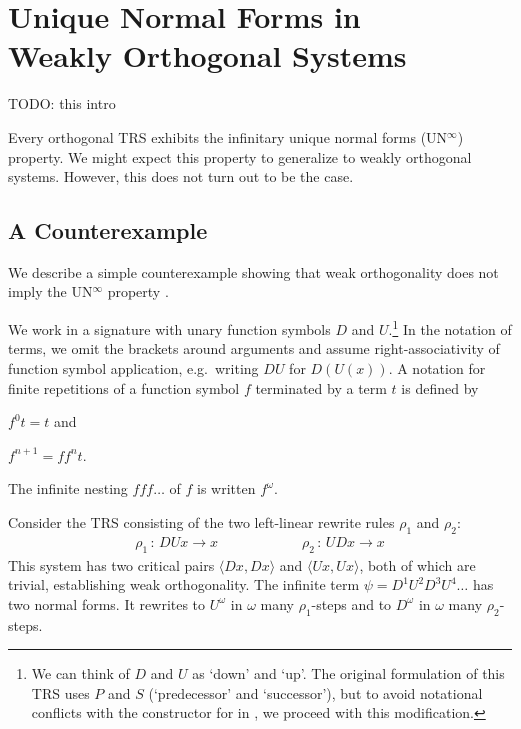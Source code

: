 \chapter[\texorpdfstring{UN$^\infty$ in Weakly Orthogonal Systems}{UN
  in Weakly Orthogonal Systems}]{\texorpdfstring{Unique Normal Forms
    in\\Weakly Orthogonal Systems}{Unique Normal Forms in Weakly
    Orthogonal Systems}}\label{chap:unwo}

TODO: this intro

Every orthogonal TRS exhibits the infinitary unique normal forms
(UN$^\infty$) property. We might expect this property to generalize to
weakly orthogonal systems. However, this does not turn out to be the
case.


\section{A Counterexample}\label{sec:counterexample}


We describe a simple counterexample showing that weak orthogonality
does not imply the UN$^\infty$ property \citep{endrullis-10}.

We work in a signature with unary function symbols $D$ and
$U$.\footnote{We can think of $D$ and $U$ as `down' and `up'. The
  original formulation of this TRS uses $P$ and $S$ (`predecessor' and
  `successor'), but to avoid notational conflicts with the
  constructor for
  in \Coq, we proceed with this modification.}
In the notation of terms, we omit the brackets around arguments and
assume right-associativity of function symbol application,
e.g.\ writing $DU$ for $D(U(x))$. A notation for finite repetitions of
a function symbol $f$ terminated by a term $t$ is defined by
\begin{inparaenum}[(i)]
\item $f^0 t = t$ and
\item $f^{n+1} = ff^nt$.
\end{inparaenum}
The infinite nesting $fff \ldots$ of $f$ is written $f^\omega$.

Consider the TRS consisting of the two left-linear rewrite rules
$\rho_1$ and $\rho_2$:
\begin{align*}
  \rho_1 \, : \, DUx \to x \qquad \qquad \qquad
  \rho_2 \, : \, UDx \to x
\end{align*}
This system has two critical pairs $\langle Dx, Dx \rangle$ and
$\langle Ux, Ux \rangle$, both of which are trivial, establishing
weak orthogonality. The infinite term $\psi = D^1 U^2 D^3 U^4 \ldots$
has two normal forms. It rewrites to $U^\omega$ in $\omega$ many
$\rho_1$-steps and to $D^\omega$ in $\omega$ many $\rho_2$-steps.

